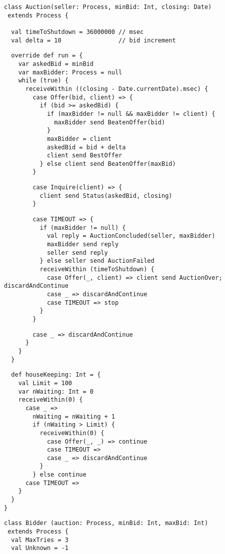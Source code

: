 \begin{itemize}
{\begin{lstlisting}
class Auction(seller: Process, minBid: Int, closing: Date)
 extends Process {

  val timeToShutdown = 36000000 // msec
  val delta = 10                // bid increment
\end{lstlisting}
\begin{lstlisting}
  override def run = {
    var askedBid = minBid
    var maxBidder: Process = null
    while (true) {
      receiveWithin ((closing - Date.currentDate).msec) {
        case Offer(bid, client) => {
          if (bid >= askedBid) {
            if (maxBidder != null && maxBidder != client) {
              maxBidder send BeatenOffer(bid)
            }
            maxBidder = client
            askedBid = bid + delta
            client send BestOffer
          } else client send BeatenOffer(maxBid)
        }
\end{lstlisting}
\begin{lstlisting}
        case Inquire(client) => {
          client send Status(askedBid, closing)
        }
\end{lstlisting}
\begin{lstlisting}
        case TIMEOUT => {
          if (maxBidder != null) {
            val reply = AuctionConcluded(seller, maxBidder)
            maxBidder send reply
            seller send reply
          } else seller send AuctionFailed
          receiveWithin (timeToShutdown) {
            case Offer(_, client) => client send AuctionOver; discardAndContinue
            case _ => discardAndContinue
            case TIMEOUT => stop
          }
        }
\end{lstlisting}
\begin{lstlisting}
        case _ => discardAndContinue
      }
    }
  }
\end{lstlisting}
\begin{lstlisting}
  def houseKeeping: Int = {
    val Limit = 100
    var nWaiting: Int = 0
    receiveWithin(0) {
      case _ =>
        nWaiting = nWaiting + 1
        if (nWaiting > Limit) {
          receiveWithin(0) {
            case Offer(_, _) => continue
            case TIMEOUT =>
            case _ => discardAndContinue
          }
        } else continue
      case TIMEOUT =>
    }
  }
}
\end{lstlisting}
\begin{lstlisting}
class Bidder (auction: Process, minBid: Int, maxBid: Int)
 extends Process {
  val MaxTries = 3
  val Unknown = -1


\end{lstlisting}}
\end{itemize}
